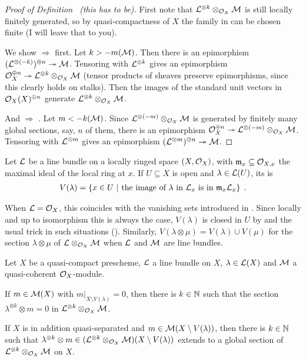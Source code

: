 \documentclass[a4paper,parskip=half,numbers=enddot, DIV=12]{scrreprt}
\begin{document}
\begin{proof}[Proof of Definition~ (this has to be)]
	First note that $\mathcal{L}^{\otimes k}\otimes_{\mathcal{O}_X}\mathcal{M}$ is still locally finitely generated, so by quasi-compactness of $X$ the family in  can be chosen finite (I will leave that to you).
	
	We show  $\Rightarrow$  first. Let $k>-m(\mathcal{M})$. Then there is an epimorphism $(\Ll^{\otimes (-k)})^{\oplus n}\epimorphism \Mm$. Tensoring with $\mathcal{L}^{\otimes k}$ gives an epimorphism $\Oo_X^{\oplus n}\epimorphism \Ll^{\otimes k}\otimes_{\Oo_X}\Mm$ (tensor products of sheaves preserve epimorphisms, since this clearly holds on stalks). Then the images of the standard unit vectors in $\mathcal{O}_X(X)^{\oplus n}$ generate $\mathcal{L}^{\otimes k}\otimes_{\mathcal{O}_X}\mathcal{M}$.
	
	And  $\Rightarrow$ . Let $m<-k(\mathcal{M})$. Since $\mathcal{L}^{\otimes(-m)}\otimes_{\mathcal{O}_X}\mathcal{M}$ is generated by finitely many global sections, say, $n$ of them, there is an epimorphism $\Oo_X^{\oplus n}\epimorphism\Ll^{\otimes(-m)}\otimes_{\Oo_X}\Mm$. Tensoring with $\mathcal{L}^{\otimes m}$ gives an epimorphism $(\Ll^{\otimes m})^{\oplus n}\epimorphism\Mm$.
\end{proof}
\begin{defi}
	Let $\mathcal{L}$ be a line bundle on a locally ringed space $(X,\mathcal{O}_X)$, with $\mathfrak{m}_x\subseteq \mathcal{O}_{X,x}$ the maximal ideal of the local ring at $x$. If $U\subseteq X$ is open and $\lambda\in\mathcal{L}(U)$, its  is
	\begin{align*}
		V(\lambda)=\left\{x\in U\ \middle|\ \text{the image of }\lambda\text{ in }\mathcal{L}_x\text{ is in }\mathfrak{m}_x\mathcal{L}_x\right\}\;.
	\end{align*}
\end{defi}
\begin{rem*}
	When $\mathcal{L}=\mathcal{O}_X$, this coincides with the vanishing sets introduced in \cite[Definition~1.3.3]{alggeo1}. Since locally and up to isomorphism this is always the case, $V(\lambda)$ is closed in $U$ by \cite[Fact~1.3.1]{alggeo1} and the usual trick in such situations (\cite[Remark~1.1.4]{alggeo1}). Similarly, $V(\lambda\otimes \mu)=V(\lambda)\cup V(\mu)$ for the section $\lambda\otimes\mu$ of $\mathcal{L}\otimes_{\mathcal{O}_X}\mathcal{M}$ when $\mathcal{L}$ and $\mathcal{M}$ are line bundles. 
\end{rem*}
\begin{lem}
	Let $X$ be a quasi-compact prescheme, $\mathcal{L}$ a line bundle on $X$, $\lambda\in\mathcal{L}(X)$ and $\mathcal{M}$ a quasi-coherent $\mathcal{O}_X$-module.
	\begin{alphanumerate}
		\item If $m\in\mathcal{M}(X)$ with $m|_{X\setminus V(\lambda)}=0$, then there is $k\in\mathbb{N}$ such that the section $\lambda^{\otimes k}\otimes m=0$ in $\mathcal{L}^{\otimes k}\otimes_{\mathcal{O}_X}\mathcal{M}$.
		\item If $X$ is in addition quasi-separated and $m\in\mathcal{M}(X\setminus V(\lambda))$, then there is $k\in\mathbb{N}$ such that $\lambda^{\otimes k}\otimes m\in(\mathcal{L}^{\otimes k}\otimes_{\mathcal{O}_X}\mathcal{M})(X\setminus V(\lambda))$ extends to a global section of $\mathcal{L}^{\otimes k}\otimes_{\mathcal{O}_X}\mathcal{M}$ on $X$.
	\end{alphanumerate}
\end{lem}
\end{document}
